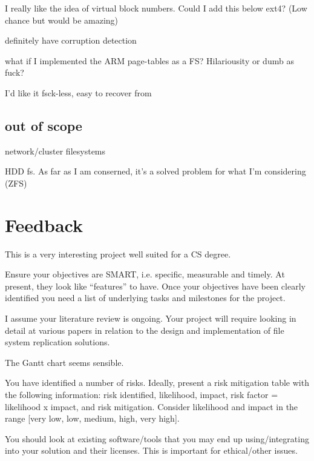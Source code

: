 \documentclass[a4paper]{report}
\begin{document}
        I really like the idea of virtual block numbers. Could I add this below
        ext4? (Low chance but would be amazing)

        definitely have corruption detection

        what if I implemented the ARM page-tables as a FS? Hilariousity or dumb as fuck?

        I'd like it fsck-less, easy to recover from

        \subsection{out of scope}

            network/cluster filesystems

            HDD fs. As far as I am conserned, it's a solved problem for what
            I'm considering (ZFS)


    \section{Feedback}
        This is a very interesting project well suited for a CS degree.

        Ensure your objectives are SMART, i.e. specific, measurable and timely.
        At present, they look like “features” to have. Once your objectives
        have been clearly identified you need a list of underlying tasks and
        milestones for the project.

        I assume your literature review is ongoing. Your project will require
        looking in detail at various papers in relation to the design and
        implementation of file system replication solutions.

        The Gantt chart  seems sensible.

        You have identified a number of risks. Ideally, present a risk
        mitigation table with the following information: risk identified,
        likelihood, impact, risk factor = likelihood x impact, and risk
        mitigation. Consider likelihood and impact in the range [very low, low,
        medium, high, very high].

        You should look at existing software/tools that you may end up
        using/integrating into your solution and their licenses. This is
        important for ethical/other issues.
\end{document}
